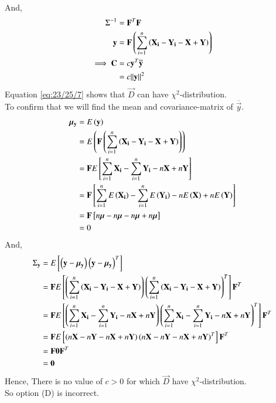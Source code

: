 \documentclass[journal,12pt,onecolumn]{IEEEtran}
\theoremstyle{remark}
\begin{document}
\begin{enumerate}[label=(\alph*)]
\begin{align}
\end{align}
And,
\begin{align}
{\Sigma}^{-1} &= {\vec{F}}^T\vec{F}  \\
\vec{y} &= \vec{F}\brak{\sum_{i=1}^{n}\brak{\vec{X_i}-\vec{Y_i}-\vec{X}+\vec{Y}}} \\
\implies \vec{C} &= c{\vec{y}}^T\overline{\vec{y}} \\
                 &= c{\norm{\vec{y}}}^2  \label{eq:23/25/7}
\end{align}
Equation \eqref{eq:23/25/7} shows that $\vec{D}$ can have ${\chi}^2$-distribution. \\
To confirm that we will find the mean and covariance-matrix of $\overline{\vec{y}}$.
\begin{align}
{\bm{\mu}}_{\mathbf{y}} &= E\left(\mathbf{y}\right) \\
                     &= E\left(\mathbf{F}\left(\sum_{i=1}^{n}\left(\mathbf{X_i}-\mathbf{Y_i}-\mathbf{X}+\mathbf{Y}\right)\right)\right) \\
                     &= \mathbf{F}E{}\left[\sum_{i=1}^{n}\mathbf{X_i}-\sum_{i=1}^{n}\mathbf{Y_i}-n\mathbf{X}+n\mathbf{Y}\right] \\
                     &= \mathbf{F}{}\left[\sum_{i=1}^{n}E\left(\mathbf{X_i}\right)-\sum_{i=1}^{n}E\left(\mathbf{Y_i}\right)-nE\left(\mathbf{X}\right)+nE\left(\mathbf{Y}\right)\right] \\
                     &= \mathbf{F}{}\left[n\bm{\mu}-n\bm{\mu}-n\bm{\mu}+n\bm{\mu}\right] \\
                     &= 0
\end{align}
And,
\begin{align}
{\Sigma}_{\mathbf{y}} &= E{}\left[\left(\mathbf{y}-{\bm{\mu}}_{\mathbf{y}}\right){\left(\mathbf{y}-{\bm{\mu}}_{\mathbf{y}}\right)}^T\right] \\
                   &= \mathbf{F}E{}\left[\left(\sum_{i=1}^{n}\left(\mathbf{X_i}-\mathbf{Y_i}-\mathbf{X}+\mathbf{Y}\right)\right){\left(\sum_{i=1}^{n}\left(\mathbf{X_i}-\mathbf{Y_i}-\mathbf{X}+\mathbf{Y}\right)\right)}^T\right]{\mathbf{F}}^T \\
                   &= \mathbf{F}E{}\left[\left(\sum_{i=1}^{n}\mathbf{X_i}-\sum_{i=1}^{n}\mathbf{Y_i}-n\mathbf{X}+n\mathbf{Y}\right){\left(\sum_{i=1}^{n}\mathbf{X_i}-\sum_{i=1}^{n}\mathbf{Y_i}-n\mathbf{X}+n\mathbf{Y}\right)}^T\right]{\mathbf{F}}^T \\
                   &= \mathbf{F}E{}\left[\left(n\mathbf{X}-n\mathbf{Y}-n\mathbf{X}+n\mathbf{Y}\right){\left(n\mathbf{X}-n\mathbf{Y}-n\mathbf{X}+n\mathbf{Y}\right)}^T\right]{\mathbf{F}}^T \\
                   &= \mathbf{F}\bm{0}{\mathbf{F}}^T  \\
                   &= \bm{0} 
\end{align}
Hence, There is no value of $c>0$ for which $\vec{D}$ have ${\chi}^2$-distribution.\\
So option (D) is incorrect. 
\end{enumerate}
\end{document}
